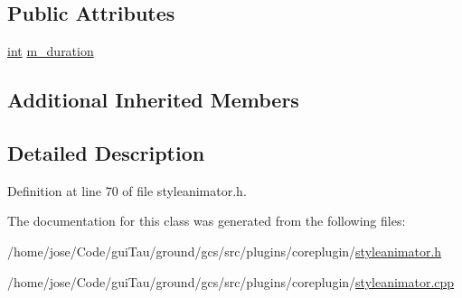 \subsection*{Public Attributes}
\begin{DoxyCompactItemize}
\item 
\hyperlink{ioapi_8h_a787fa3cf048117ba7123753c1e74fcd6}{int} \hyperlink{group___core_plugin_ga639f199e1b6793134583974181d4c072}{m\-\_\-duration}
\end{DoxyCompactItemize}
\subsection*{Additional Inherited Members}


\subsection{Detailed Description}


Definition at line 70 of file styleanimator.\-h.



The documentation for this class was generated from the following files\-:\begin{DoxyCompactItemize}
\item 
/home/jose/\-Code/gui\-Tau/ground/gcs/src/plugins/coreplugin/\hyperlink{styleanimator_8h}{styleanimator.\-h}\item 
/home/jose/\-Code/gui\-Tau/ground/gcs/src/plugins/coreplugin/\hyperlink{styleanimator_8cpp}{styleanimator.\-cpp}\end{DoxyCompactItemize}
